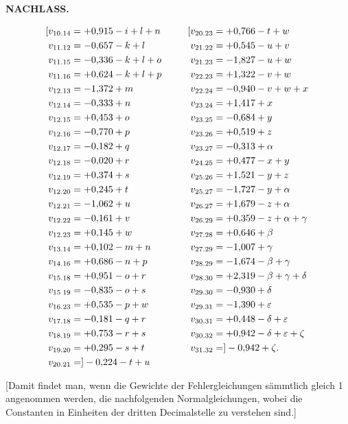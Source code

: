 \par\clearpage
\noindent{}\hfill{\small\textbf{NACHLASS.}}\hfill\null\par\medskip
\[
\begin{aligned}
\makebox[0pt][r]{[}v_{10.14}&=+0{,}915-i+l+n &\qquad \makebox[0pt][r]{[}v_{20.23}&=+0{,}766-t+w\\
v_{11.12}&=-0{,}657-k+l &\qquad v_{21.22}&=+0{,}545-u+v\\
v_{11.15}&=-0{,}336-k+l+o &\qquad v_{21.23}&=-1{,}827-u+w\\
v_{11.16}&=+0{,}624-k+l+p &\qquad v_{22.23}&=+1{,}322-v+w\\
v_{12.13}&=-1{,}372+m &\qquad v_{22.24}&=-0{,}940-v+w+x\\
v_{12.14}&=-0{,}333+n &\qquad v_{23.24}&=+1{,}417+x\\
v_{12.15}&=+0{,}453+o &\qquad v_{23.25}&=-0{,}684+y\\
v_{12.16}&=-0{,}770+p &\qquad v_{23.26}&=+0{,}519+z\\
v_{12.17}&=-0{,}182+q &\qquad v_{23.27}&=-0{,}313+\alpha\\
v_{12.18}&=-0{,}020+r &\qquad v_{24.25}&=+0{,}477-x+y\\
v_{12.19}&=+0{,}374+s &\qquad v_{25.26}&=+1{,}521-y+z\\
v_{12.20}&=+0{,}245+t &\qquad v_{25.27}&=-1{,}727-y+\alpha\\
v_{12.21}&=-1{,}062+u &\qquad v_{26.27}&=+1{,}679-z+\alpha\\
v_{12.22}&=-0{,}161+v &\qquad v_{26.29}&=+0{,}359-z+\alpha+\gamma\\
v_{12.23}&=+0{,}145+w &\qquad v_{27.28}&=+0{,}646+\beta\\
v_{13.14}&=+0{,}102-m+n &\qquad v_{27.29}&=-1{,}007+\gamma\\
v_{14.16}&=+0{,}686-n+p &\qquad v_{28.29}&=-1{,}674-\beta+\gamma\\
v_{15.18}&=+0{,}951-o+r &\qquad v_{28.30}&=+2{,}319-\beta+\gamma+\delta\\
v_{15\;19}&=-0{,}835-o+s &\qquad v_{29.30}&=-0{,}930+\delta\\
v_{16.23}&=+0{,}535-p+w &\qquad v_{29.31}&=-1{,}390+\varepsilon\\
v_{17.18}&=-0{,}181-q+r &\qquad v_{30.31}&=+0{,}448-\delta+\varepsilon\\
v_{18.19}&=+0{,}753-r+s &\qquad v_{30.32}&=+0{,}942-\delta+\varepsilon+\zeta\\
v_{19.20}&=+0{,}295-s+t &\qquad v_{31.32}&=]-0{,}942+\zeta.\\
v_{20.21}&=]-0{,}224-t+u &\qquad &\\
\end{aligned}
\]
\par\medskip
\par\noindent\hspace*{\parindent}[Damit findet man, wenn die Gewichte der Fehlergleichungen sämmtlich
gleich 1 angenommen werden, die nachfolgenden Normalgleichungen, wobei
die Constanten in Einheiten der dritten Decimalstelle zu verstehen sind.]

